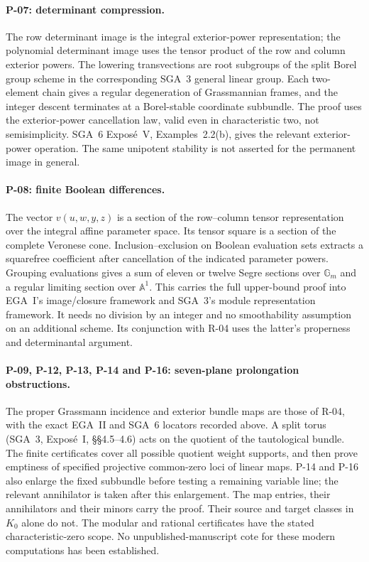 \paragraph{P-07: determinant compression.}
The row determinant image is the integral exterior-power
representation; the polynomial determinant image uses
the tensor product of the row and column exterior powers.
The lowering transvections are root subgroups of the
split Borel group scheme in the corresponding SGA~3
general linear group. Each two-element chain gives a
regular degeneration of Grassmannian frames, and the
integer descent terminates at a Borel-stable coordinate
subbundle. The proof uses the exterior-power cancellation
law, valid even in characteristic two, not semisimplicity.
SGA~6 Expos\'e~V, Examples~2.2(b), gives the relevant
exterior-power operation. The same unipotent stability
is not asserted for the permanent image in general.

\paragraph{P-08: finite Boolean differences.}
The vector $v(u,w,y,z)$ is a section of the row--column
tensor representation over the integral affine parameter
space. Its tensor square is a section of the complete
Veronese cone. Inclusion--exclusion on Boolean evaluation
sets extracts a squarefree coefficient after cancellation
of the indicated parameter powers. Grouping evaluations
gives a sum of eleven or twelve Segre sections over
$\mathbb G_m$ and a regular limiting section over
$\mathbb A^1$. This carries the full upper-bound proof
into EGA~I's image/closure framework and SGA~3's module
representation framework. It needs no division by an
integer and no smoothability assumption on an additional
scheme. Its conjunction with R-04 uses the latter's
properness and determinantal argument.

\paragraph{P-09, P-12, P-13, P-14 and P-16: seven-plane prolongation obstructions.}
The proper Grassmann incidence and exterior bundle maps are those of
R-04, with the exact EGA~II and SGA~6 locators recorded above.
A split torus (SGA~3, Expos\'e~I, \S\S4.5--4.6) acts on the
quotient of the tautological bundle. The finite certificates cover
all possible quotient weight supports, and then prove emptiness
of specified projective common-zero loci of linear maps.
P-14 and P-16 also enlarge the fixed subbundle before testing a
remaining variable line; the relevant annihilator is taken after
this enlargement. The map entries, their annihilators and their
minors carry the proof. Their source and target classes in $K_0$
alone do not. The modular and rational certificates have the
stated characteristic-zero scope. No unpublished-manuscript cote
for these modern computations has been established.

